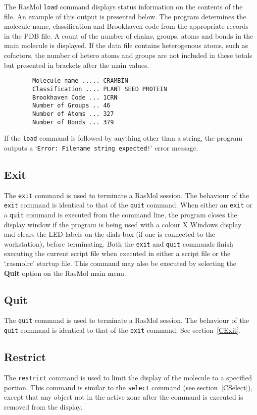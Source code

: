 The RasMol {\tt load} command displays status information on the contents
of the file. An example of this output is presented below. The program
determines the molecule name, classification and Brookhaven code from the
appropriate records in the PDB file. A count of the number of chains, groups, 
atoms and bonds in the main molecule is displayed. If the data file contains 
heterogenous atoms, such as cofactors, the number of hetero atoms and groups
are not included in these totals but presented in brackets after the main
values.

\begin{verbatim}
        Molecule name ..... CRAMBIN
        Classification .... PLANT SEED PROTEIN
        Brookhaven Code ... 1CRN
        Number of Groups .. 46
        Number of Atoms ... 327
        Number of Bonds ... 379
\end{verbatim}

If the {\tt load} command is followed by anything other than a string, the
program outputs a `{\tt Error: Filename string expected!}' error message.

\subsection{Exit}
\label{CExit}
The {\tt exit} command is used to terminate a RasMol session. The behaviour
of the {\tt exit} command is identical to that of the {\tt quit} command. 
When either an {\tt exit} or a {\tt quit} command is executed from the
command line, the program closes the display window if the program is being
used with a colour X Windows display and clears the LED labels on the dials
box (if one is connected to the workstation), before terminating. Both the
{\tt exit} and {\tt quit} commands finish executing the current script file
when executed in either a script file or the `.rasmolrc' startup file. This
command may also be executed by selecting the {\bf Quit} option on the
RasMol main menu.

\subsection{Quit}
\label{CQuit}
The {\tt quit} command is used to terminate a RasMol session. The behaviour
of the {\tt quit} command is identical to that of the {\tt exit} command.
See section~\ref{CExit}.


\subsection{Restrict}
\label{CRestrict}
The {\tt restrict} command is used to limit the display of the molecule to
a specified portion. This command is similar to the {\tt select} command
(see section~\ref{CSelect}), except that any object not in the active zone
after the command is executed is removed from the display.

